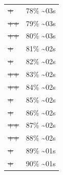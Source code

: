 \documentclass[12pt]{article}
\begin{document}
\begin{center}
\begin{tabular}{ll}
\sout{\sout{\sout{\sout{\sout{\sout{\sout{\sout{\sout{\sout{\sout{\sout{\sout{\sout{\sout{\sout{\sout{\sout{\sout{+}}}}}}}}}}}}}}}}}}} & 78\% \textasciitilde{}03s\\
\sout{\sout{\sout{\sout{\sout{\sout{\sout{\sout{\sout{\sout{\sout{\sout{\sout{\sout{\sout{\sout{\sout{\sout{\sout{++}}}}}}}}}}}}}}}}}}} & 79\% \textasciitilde{}03s\\
\sout{\sout{\sout{\sout{\sout{\sout{\sout{\sout{\sout{\sout{\sout{\sout{\sout{\sout{\sout{\sout{\sout{\sout{\sout{++}}}}}}}}}}}}}}}}}}} & 80\% \textasciitilde{}03s\\
\sout{\sout{\sout{\sout{\sout{\sout{\sout{\sout{\sout{\sout{\sout{\sout{\sout{\sout{\sout{\sout{\sout{\sout{\sout{\sout{+}}}}}}}}}}}}}}}}}}}} & 81\% \textasciitilde{}02s\\
\sout{\sout{\sout{\sout{\sout{\sout{\sout{\sout{\sout{\sout{\sout{\sout{\sout{\sout{\sout{\sout{\sout{\sout{\sout{\sout{+}}}}}}}}}}}}}}}}}}}} & 82\% \textasciitilde{}02s\\
\sout{\sout{\sout{\sout{\sout{\sout{\sout{\sout{\sout{\sout{\sout{\sout{\sout{\sout{\sout{\sout{\sout{\sout{\sout{\sout{++}}}}}}}}}}}}}}}}}}}} & 83\% \textasciitilde{}02s\\
\sout{\sout{\sout{\sout{\sout{\sout{\sout{\sout{\sout{\sout{\sout{\sout{\sout{\sout{\sout{\sout{\sout{\sout{\sout{\sout{++}}}}}}}}}}}}}}}}}}}} & 84\% \textasciitilde{}02s\\
\sout{\sout{\sout{\sout{\sout{\sout{\sout{\sout{\sout{\sout{\sout{\sout{\sout{\sout{\sout{\sout{\sout{\sout{\sout{\sout{\sout{+}}}}}}}}}}}}}}}}}}}}} & 85\% \textasciitilde{}02s\\
\sout{\sout{\sout{\sout{\sout{\sout{\sout{\sout{\sout{\sout{\sout{\sout{\sout{\sout{\sout{\sout{\sout{\sout{\sout{\sout{\sout{+}}}}}}}}}}}}}}}}}}}}} & 86\% \textasciitilde{}02s\\
\sout{\sout{\sout{\sout{\sout{\sout{\sout{\sout{\sout{\sout{\sout{\sout{\sout{\sout{\sout{\sout{\sout{\sout{\sout{\sout{\sout{++}}}}}}}}}}}}}}}}}}}}} & 87\% \textasciitilde{}02s\\
\sout{\sout{\sout{\sout{\sout{\sout{\sout{\sout{\sout{\sout{\sout{\sout{\sout{\sout{\sout{\sout{\sout{\sout{\sout{\sout{\sout{++}}}}}}}}}}}}}}}}}}}}} & 88\% \textasciitilde{}02s\\
\sout{\sout{\sout{\sout{\sout{\sout{\sout{\sout{\sout{\sout{\sout{\sout{\sout{\sout{\sout{\sout{\sout{\sout{\sout{\sout{\sout{\sout{+}}}}}}}}}}}}}}}}}}}}}} & 89\% \textasciitilde{}01s\\
\sout{\sout{\sout{\sout{\sout{\sout{\sout{\sout{\sout{\sout{\sout{\sout{\sout{\sout{\sout{\sout{\sout{\sout{\sout{\sout{\sout{\sout{+}}}}}}}}}}}}}}}}}}}}}} & 90\% \textasciitilde{}01s\\

\end{tabular}
\end{center}
\end{document}
